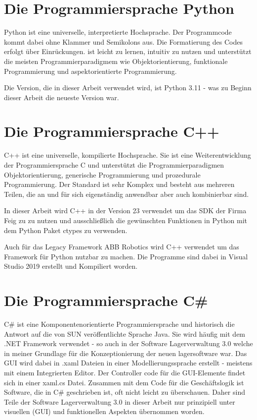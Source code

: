 \section{Die Programmiersprache Python}

Python ist eine universelle, interpretierte Hochsprache. Der Programmcode kommt dabei ohne Klammer und Semikolons aus.
Die Formatierung des Codes erfolgt über Einrückungen. \cite[Python]{Python} ist leicht zu lernen, intuitiv zu nutzen und unterstützt die 
meisten Programmierparadigmem wie Objektorientierung, funktionale Programmierung und aspektorientierte Programmierung. 

Die Version, die in dieser Arbeit verwendet wird, ist Python 3.11 - was zu Beginn dieser Arbeit die neueste Version war. 

\section{Die Programmiersprache C++}

C++ ist eine universelle, kompilierte Hochsprache. Sie ist eine Weiterentwicklung der Programmiersprache C und unterstützt die
Programmierparadigmen Objektorientierung, generische Programmierung und prozedurale Programmierung.
Der Standard ist sehr Komplex und besteht aus mehreren Teilen, die an und für sich eigenständig anwendbar aber auch kombinierbar sind.

In dieser Arbeit wird C++ in der Version 23 verwendet um das SDK der Firma Feig zu zu nutzen und ausschließlich die gewünschten Funktionen 
in Python mit dem Python Paket ctypes zu verwenden.

Auch für das Legacy Framework ABB Robotics wird C++ verwendet um das Framework für Python nutzbar zu machen.
Die Programme sind dabei in Visual Studio 2019 erstellt und Kompiliert worden. 

\section{Die Programmiersprache C\#}\label{Csharp}

C$\#$ ist eine Komponentenorientierte Programmiersprache und historisch die Antwort auf die von SUN veröffentlichte Sprache Java. 
Sie wird häufig mit dem .NET Framework verwendet - so auch in der Software Lagerverwaltung 3.0 welche in meiner \cite[Semesterarbeit]{Semesterarbeit}
Grundlage für die Konzeptionierung der neuen lagersoftware war. 
Das GUI wird dabei in .xaml Dateien in einer Modellierungssprache erstellt - meistens mit einem Integrierten Editor. Der Controller code für die GUI-Elemente 
findet sich in einer xaml.cs Datei. Zusammen mit dem Code für die Geschäftslogik ist Software, die in C$\#$ geschrieben ist, oft nicht leicht zu überschauen. 
Daher sind Teile der Software Lagerverwaltung 3.0 in dieser Arbeit nur prinzipiell unter visuellen (GUI) und funktionellen Aspekten übernommen worden.

